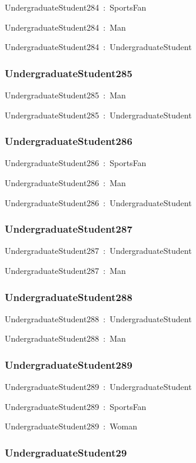 \documentclass{article}
\begin{document}
UndergraduateStudent284~:~SportsFan

UndergraduateStudent284~:~Man

UndergraduateStudent284~:~UndergraduateStudent

\subsubsection*{UndergraduateStudent285}

UndergraduateStudent285~:~Man

UndergraduateStudent285~:~UndergraduateStudent

\subsubsection*{UndergraduateStudent286}

UndergraduateStudent286~:~SportsFan

UndergraduateStudent286~:~Man

UndergraduateStudent286~:~UndergraduateStudent

\subsubsection*{UndergraduateStudent287}

UndergraduateStudent287~:~UndergraduateStudent

UndergraduateStudent287~:~Man

\subsubsection*{UndergraduateStudent288}

UndergraduateStudent288~:~UndergraduateStudent

UndergraduateStudent288~:~Man

\subsubsection*{UndergraduateStudent289}

UndergraduateStudent289~:~UndergraduateStudent

UndergraduateStudent289~:~SportsFan

UndergraduateStudent289~:~Woman

\subsubsection*{UndergraduateStudent29}
\end{document}
